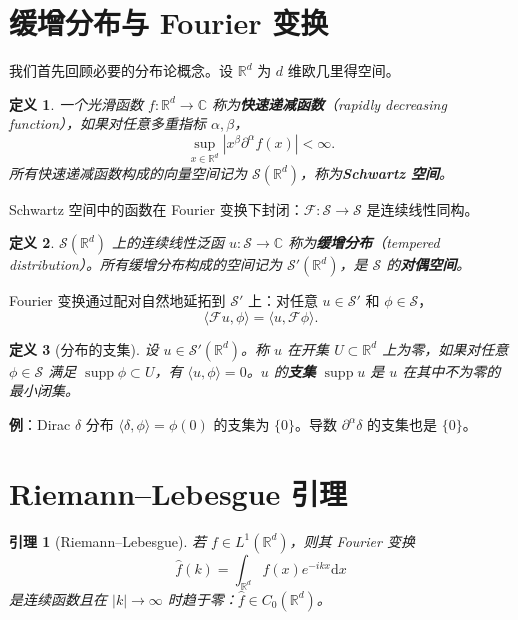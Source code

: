 \documentclass{book}
\newcommand{\mathd}{\mathrm{d}}
\newtheorem{lemma}{引理}[chapter]
\newtheorem{definition}{定义}[chapter]
\begin{document}
\section{缓增分布与 Fourier 变换}

我们首先回顾必要的分布论概念。设 $\mathbb{R}^d$ 为 $d$ 维欧几里得空间。

\begin{definition}
  一个光滑函数 $f: \mathbb{R}^d \to \mathbb{C}$ 称为\textbf{快速递减函数}（rapidly decreasing function），如果对任意多重指标 $\alpha, \beta$，
  \[
  \sup_{x \in \mathbb{R}^d} |x^\beta \partial^\alpha f(x)| < \infty.
  \]
  所有快速递减函数构成的向量空间记为 $\mathcal{S}(\mathbb{R}^d)$，称为\textbf{Schwartz 空间}。
\end{definition}

Schwartz 空间中的函数在 Fourier 变换下封闭：$\mathcal{F}: \mathcal{S} \to \mathcal{S}$ 是连续线性同构。

\begin{definition}
  $\mathcal{S}(\mathbb{R}^d)$ 上的连续线性泛函 $u: \mathcal{S} \to \mathbb{C}$ 称为\textbf{缓增分布}（tempered distribution）。所有缓增分布构成的空间记为 $\mathcal{S}'(\mathbb{R}^d)$，是 $\mathcal{S}$ 的\textbf{对偶空间}。
\end{definition}

Fourier 变换通过配对自然地延拓到 $\mathcal{S}'$ 上：对任意 $u \in \mathcal{S}'$ 和 $\phi \in \mathcal{S}$，
\[
\langle \mathcal{F}u, \phi \rangle = \langle u, \mathcal{F}\phi \rangle.
\]

\begin{definition}[分布的支集]
  设 $u \in \mathcal{S}'(\mathbb{R}^d)$。称 $u$ 在开集 $U \subset \mathbb{R}^d$ 上为零，如果对任意 $\phi \in \mathcal{S}$ 满足 $\operatorname{supp} \phi \subset U$，有 $\langle u, \phi \rangle = 0$。$u$ 的\textbf{支集} $\operatorname{supp} u$ 是 $u$ 在其中不为零的最小闭集。
\end{definition}

{\bfseries 例}：Dirac $\delta$ 分布 $\langle \delta, \phi \rangle = \phi(0)$ 的支集为 $\{0\}$。导数 $\partial^\alpha \delta$ 的支集也是 $\{0\}$。

\section{Riemann--Lebesgue 引理}

\begin{lemma}[Riemann--Lebesgue]
  若 $f \in L^1(\mathbb{R}^d)$，则其 Fourier 变换
  \[
  \hat{f}(k) = \int_{\mathbb{R}^d} f(x) e^{-i k x} \mathd x
  \]
  是连续函数且在 $|k| \to \infty$ 时趋于零：$\hat{f} \in C_0(\mathbb{R}^d)$。
\end{lemma}
\end{document}
